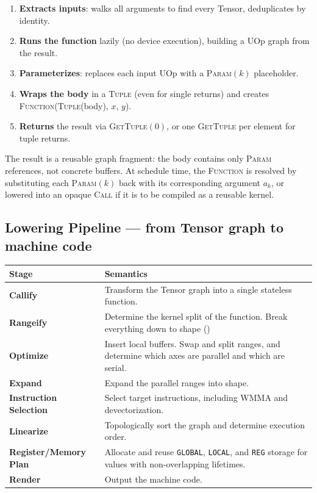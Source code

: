 \documentclass[10pt,letterpaper]{article}
\newcommand{\op}[1]{\textsc{#1}}
\begin{document}
\begin{enumerate}[leftmargin=1.5em, itemsep=2pt]
  \item \textbf{Extracts inputs}: walks all arguments to find every Tensor, deduplicates by identity.
  \item \textbf{Runs the function} lazily (no device execution), building a UOp graph from the result.
  \item \textbf{Parameterizes}: replaces each input UOp with a \op{Param}$(k)$ placeholder.
  \item \textbf{Wraps the body} in a \op{Tuple} (even for single returns) and creates\\
        \op{Function}(\op{Tuple}(body), $x$, $y$).
  \item \textbf{Returns} the result via \op{GetTuple}$(0)$, or one \op{GetTuple} per element for tuple returns.
\end{enumerate}

The result is a reusable graph fragment: the body contains only \op{Param} references, not concrete buffers. At schedule time, the \op{Function} is resolved by substituting each \op{Param}$(k)$ back with its corresponding argument $a_k$, or lowered into an opaque \op{Call} if it is to be compiled as a reusable kernel.

\subsection*{Lowering Pipeline \normalfont\small--- from Tensor graph to machine code}

\begin{tabular}{@{}l p{9.7cm}@{}}
\toprule
\textbf{Stage} & \textbf{Semantics} \\
\midrule
\textbf{Callify} & Transform the Tensor graph into a single stateless function. \\
\textbf{Rangeify} & Determine the kernel split of the function. Break everything down to shape () \\
\textbf{Optimize} & Insert local buffers. Swap and split ranges, and determine which axes are parallel and which are serial. \\
\textbf{Expand} & Expand the parallel ranges into shape. \\
\textbf{Instruction Selection} & Select target instructions, including WMMA and devectorization. \\
\textbf{Linearize} & Topologically sort the graph and determine execution order. \\
\textbf{Register/Memory Plan} & Allocate and reuse \texttt{GLOBAL}, \texttt{LOCAL}, and \texttt{REG} storage for values with non-overlapping lifetimes. \\
\textbf{Render} & Output the machine code. \\
\bottomrule
\end{tabular}
\end{document}
